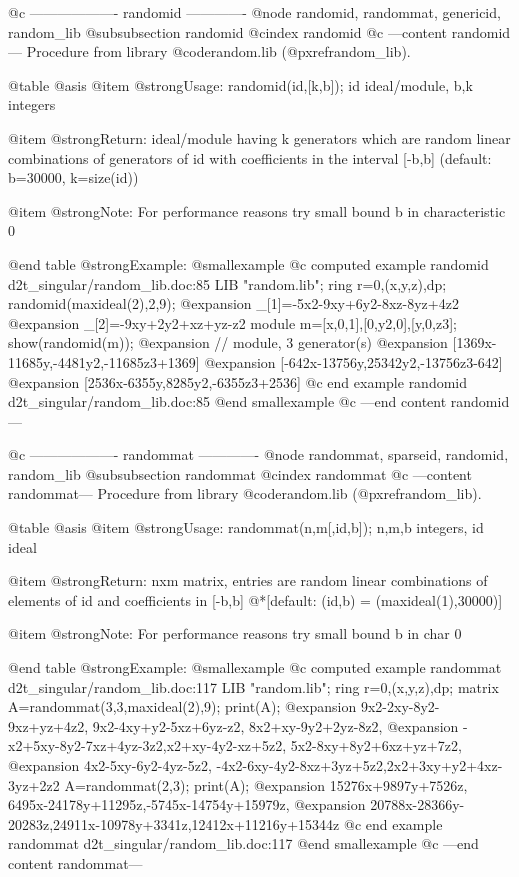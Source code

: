 @c ------------------- randomid -------------
@node randomid, randommat, genericid, random_lib
@subsubsection randomid
@cindex randomid
@c ---content randomid---
Procedure from library @code{random.lib} (@pxref{random_lib}).

@table @asis
@item @strong{Usage:}
randomid(id,[k,b]); id ideal/module, b,k integers

@item @strong{Return:}
ideal/module having k generators which are random linear combinations
of generators of id with coefficients in the interval [-b,b]
(default: b=30000, k=size(id))

@item @strong{Note:}
For performance reasons try small bound b in characteristic 0

@end table
@strong{Example:}
@smallexample
@c computed example randomid d2t_singular/random_lib.doc:85 
LIB "random.lib";
ring r=0,(x,y,z),dp;
randomid(maxideal(2),2,9);
@expansion{} _[1]=-5x2-9xy+6y2-8xz-8yz+4z2
@expansion{} _[2]=-9xy+2y2+xz+yz-z2
module m=[x,0,1],[0,y2,0],[y,0,z3];
show(randomid(m));
@expansion{} // module, 3 generator(s)
@expansion{} [1369x-11685y,-4481y2,-11685z3+1369]
@expansion{} [-642x-13756y,25342y2,-13756z3-642]
@expansion{} [2536x-6355y,8285y2,-6355z3+2536]
@c end example randomid d2t_singular/random_lib.doc:85
@end smallexample
@c ---end content randomid---

@c ------------------- randommat -------------
@node randommat, sparseid, randomid, random_lib
@subsubsection randommat
@cindex randommat
@c ---content randommat---
Procedure from library @code{random.lib} (@pxref{random_lib}).

@table @asis
@item @strong{Usage:}
randommat(n,m[,id,b]); n,m,b integers, id ideal

@item @strong{Return:}
nxm matrix, entries are random linear combinations of elements
of id and coefficients in [-b,b]
@*[default: (id,b) = (maxideal(1),30000)]

@item @strong{Note:}
For performance reasons try small bound b in char 0

@end table
@strong{Example:}
@smallexample
@c computed example randommat d2t_singular/random_lib.doc:117 
LIB "random.lib";
ring r=0,(x,y,z),dp;
matrix A=randommat(3,3,maxideal(2),9);
print(A);
@expansion{} 9x2-2xy-8y2-9xz+yz+4z2, 9x2-4xy+y2-5xz+6yz-z2,   8x2+xy-9y2+2yz-8z2,    
@expansion{} -x2+5xy-8y2-7xz+4yz-3z2,x2+xy-4y2-xz+5z2,        5x2-8xy+8y2+6xz+yz+7z2,
@expansion{} 4x2-5xy-6y2-4yz-5z2,    -4x2-6xy-4y2-8xz+3yz+5z2,2x2+3xy+y2+4xz-3yz+2z2 
A=randommat(2,3);
print(A);
@expansion{} 15276x+9897y+7526z,  6495x-24178y+11295z,-5745x-14754y+15979z,
@expansion{} 20788x-28366y-20283z,24911x-10978y+3341z,12412x+11216y+15344z 
@c end example randommat d2t_singular/random_lib.doc:117
@end smallexample
@c ---end content randommat---

